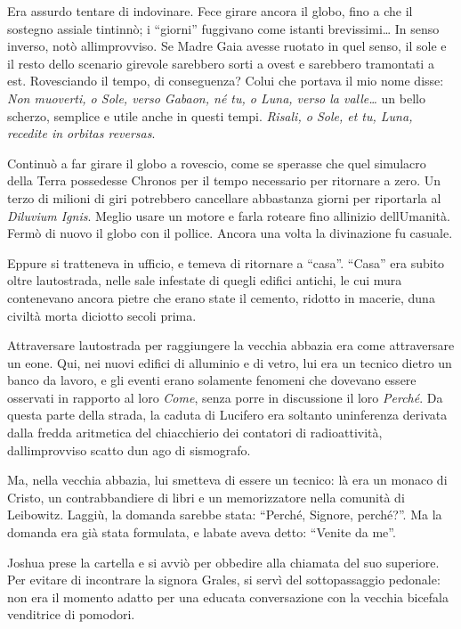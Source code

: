 	Era assurdo tentare di indovinare. Fece girare ancora il globo, fino a
	che il sostegno assiale tintinnò; i ``giorni'' fuggivano come istanti
	brevissimi\ldots{} In senso inverso, notò
	all\textquotesingle improvviso. Se Madre Gaia avesse ruotato in quel
	senso, il sole e il resto dello scenario girevole sarebbero sorti a
	ovest e sarebbero tramontati a est. Rovesciando il tempo, di
	conseguenza? Colui che portava il mio nome disse: \emph{Non muoverti, o
		Sole, verso Gabaon, né tu, o Luna, verso la valle\ldots{}} un bello
	scherzo, semplice e utile anche in questi tempi. \emph{Risali, o Sole,
		et tu, Luna, recedite in orbitas reversas}.
	
	Continuò a far girare il globo a rovescio, come se sperasse che quel
	simulacro della Terra possedesse Chronos per il tempo necessario per
	ritornare a zero. Un terzo di milioni di giri potrebbero cancellare
	abbastanza giorni per riportarla al \emph{Diluvium Ignis}. Meglio usare
	un motore e farla roteare fino all\textquotesingle inizio
	dell\textquotesingle Umanità. Fermò di nuovo il globo con il pollice.
	Ancora una volta la divinazione fu casuale.
	
	Eppure si tratteneva in ufficio, e temeva di ritornare a ``casa''.
	``Casa'' era subito oltre l\textquotesingle autostrada, nelle sale
	infestate di quegli edifici antichi, le cui mura contenevano ancora
	pietre che erano state il cemento, ridotto in macerie,
	d\textquotesingle una civiltà morta diciotto secoli prima.
	
	Attraversare l\textquotesingle autostrada per raggiungere la vecchia
	abbazia era come attraversare un eone. Qui, nei nuovi edifici di
	alluminio e di vetro, lui era un tecnico dietro un banco da lavoro, e
	gli eventi erano solamente fenomeni che dovevano essere osservati in
	rapporto al loro \emph{Come}, senza porre in discussione il loro
	\emph{Perché}. Da questa parte della strada, la caduta di Lucifero era
	soltanto un\textquotesingle inferenza derivata dalla fredda aritmetica
	del chiacchierio dei contatori di radioattività,
	dall\textquotesingle improvviso scatto d\textquotesingle un ago di
	sismografo.
	
	Ma, nella vecchia abbazia, lui smetteva di essere un tecnico: là era un
	monaco di Cristo, un contrabbandiere di libri e un memorizzatore nella
	comunità di Leibowitz. Laggiù, la domanda sarebbe stata: ``Perché,
	Signore, perché?''. Ma la domanda era già stata formulata, e
	l\textquotesingle abate aveva detto: ``Venite da me''.
	
	Joshua prese la cartella e si avviò per obbedire alla chiamata del suo
	superiore. Per evitare di incontrare la signora Grales, si servì del
	sottopassaggio pedonale: non era il momento adatto per una educata
	conversazione con la vecchia bicefala venditrice di pomodori.
	